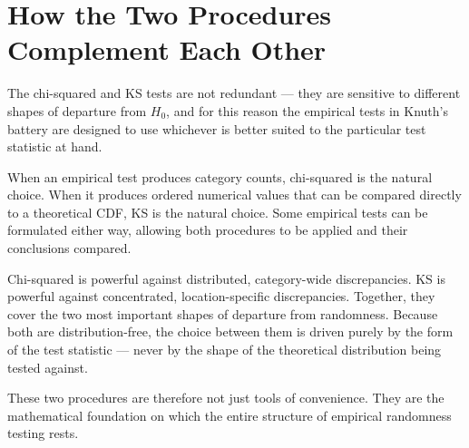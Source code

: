 \section{How the Two Procedures Complement Each Other}
 
The chi-squared and KS tests are not redundant --- they are sensitive to
different shapes of departure from $H_0$, and for this reason the empirical
tests in Knuth's battery are designed to use whichever is better suited to
the particular test statistic at hand.
 
When an empirical test produces category counts, chi-squared is the natural
choice.  When it produces ordered numerical values that can be compared
directly to a theoretical CDF, KS is the natural choice.  Some empirical
tests can be formulated either way, allowing both procedures to be applied
and their conclusions compared.
 
\begin{keyidea}
Chi-squared is powerful against distributed, category-wide discrepancies.
KS is powerful against concentrated, location-specific discrepancies.
Together, they cover the two most important shapes of departure from
randomness.  Because both are distribution-free, the choice between them
is driven purely by the form of the test statistic --- never by the shape
of the theoretical distribution being tested against.
\end{keyidea}
 
These two procedures are therefore not just tools of convenience.  They are
the mathematical foundation on which the entire structure of empirical
randomness testing rests.
